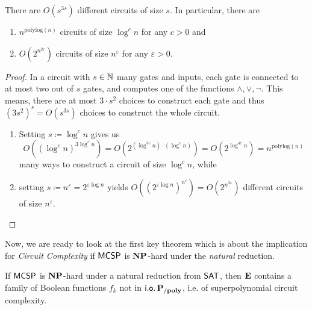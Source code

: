 \documentclass[11pt]{article}
\begin{document}
\begin{lemma}
  \label{lem:num-of-circs}
  There are $O(s^{3s})$ different circuits of size $s$.
  In particular, there are
  \begin{enumerate}
    \item $n^{\mathrm{polylog}(n)}$ circuits of size $\log^c n$ for any
      $c > 0$ and

    \item $O(2^{n^{2 \varepsilon}})$ circuits of size
      $n^\varepsilon$ for any $\varepsilon > 0$.
  \end{enumerate}
\end{lemma}

\begin{proof}
  In a circuit with $s \in {\mathbb{N}}$ many gates and inputs, each gate is connected to
  at most two out of $s$ gates, and computes one of the functions
  $\land, \lor, \neg$.
  This means, there are at most $3 \cdot s^2$ choices to construct each gate
  and thus $(3 s^2)^s = O(s^{3s})$ choices to construct the whole circuit.

  \begin{enumerate}
    \item Setting $s \coloneqq \log^c n$ gives us
      \[
        O((\log^c n)^{3 \log^c n})
        =
        O(2^{(\log^{3c} n) \cdot (\log^c n)})
        =
        O(2^{\log^{4c} n})
        =
        n^{\mathrm{polylog}(n)}
      \]
      many ways to construct a circuit of size $\log^c n$, while

    \item setting $s \coloneqq n^\varepsilon = 2^{\varepsilon \log n}$ yields
      $
        O((2^{\varepsilon \log n})^{n^\varepsilon})
        =
        O(2^{n^{2 \varepsilon}})
      $
      different circuits of size $n^\varepsilon$.
  \end{enumerate}
\end{proof}

Now, we are ready to look at the first key theorem which is about the implication for \textit{Circuit Complexity} if $\mathsf{MCSP}$ is $\mathbf{NP}$-hard under the \textit{natural} reduction.

\begin{theorem}[\cite{10.1145/335305.335314}]
  \label{thm:15-1}
  If $\mathsf{MCSP}$ is $\mathbf{NP}$-hard under a natural reduction from
  $\mathsf{SAT}$, then $\mathbf{E}$ contains a family of Boolean functions
  $f_k$ not in $\mathsf{i.o.}\, \mathbf{P_{/poly}}$, i.e. of superpolynomial circuit complexity.
\end{theorem}
\end{document}
